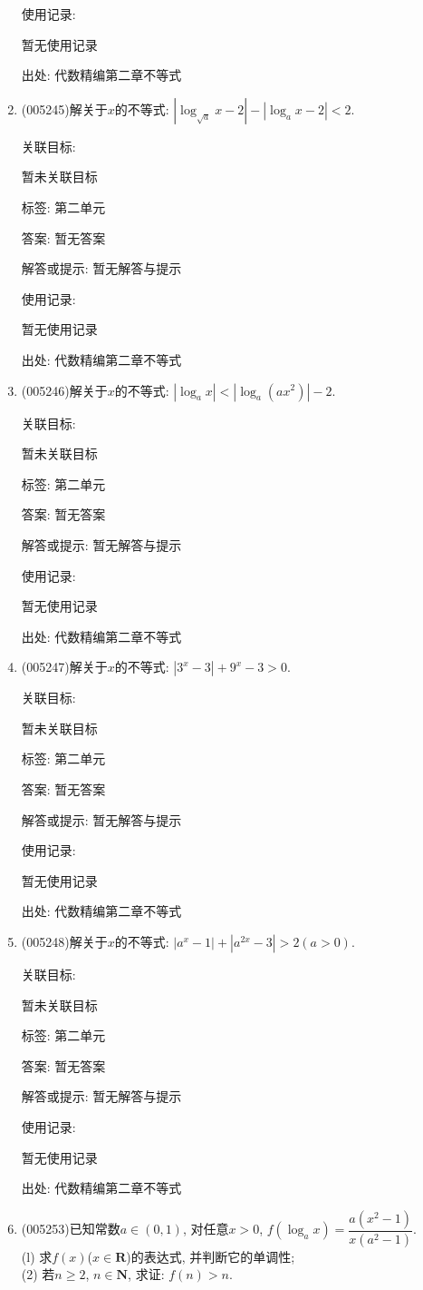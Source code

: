 \documentclass[10pt,a4paper]{article}
\begin{document}
\begin{enumerate}[1.]
使用记录:

暂无使用记录


出处: 代数精编第二章不等式
\item { (005245)}解关于$x$的不等式: $|\log_{\sqrt a}x-2|-|\log_ax-2|<2$.


关联目标:

暂未关联目标



标签: 第二单元

答案: 暂无答案

解答或提示: 暂无解答与提示

使用记录:

暂无使用记录


出处: 代数精编第二章不等式
\item { (005246)}解关于$x$的不等式: $|\log_ax|<|\log_a(ax^2)|-2$.


关联目标:

暂未关联目标



标签: 第二单元

答案: 暂无答案

解答或提示: 暂无解答与提示

使用记录:

暂无使用记录


出处: 代数精编第二章不等式
\item { (005247)}解关于$x$的不等式: $|3^x-3|+9^x-3>0$.


关联目标:

暂未关联目标



标签: 第二单元

答案: 暂无答案

解答或提示: 暂无解答与提示

使用记录:

暂无使用记录


出处: 代数精编第二章不等式
\item { (005248)}解关于$x$的不等式: $|a^x-1|+|a^{2x}-3|>2(a>0)$.


关联目标:

暂未关联目标



标签: 第二单元

答案: 暂无答案

解答或提示: 暂无解答与提示

使用记录:

暂无使用记录


出处: 代数精编第二章不等式
\item { (005253)}已知常数$a\in (0,1)$, 对任意$x>0$, $f(\log_ax)=\dfrac{a(x^2-1)}{x(a^2-1)}$.\\
(l) 求$f(x)$($x\in \mathbf{R}$)的表达式, 并判断它的单调性;\\
(2) 若$n\ge 2$, $n\in \mathbf{N}$, 求证: $f(n)>n$.



\end{enumerate}
\end{document}
